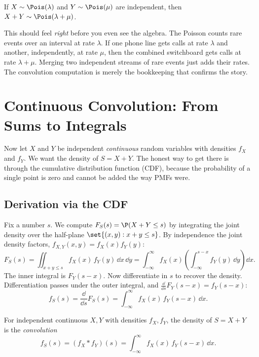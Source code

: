 \begin{theorem}
\label{ch17:thm-pois-add}
If $X\sim\Pois(\lambda)$ and $Y\sim\Pois(\mu)$ are independent, then
$X+Y \sim \Pois(\lambda+\mu)$.
\end{theorem}

\begin{intuitionbox}
This should feel \emph{right} before you even see the algebra. The Poisson
counts rare events over an interval at rate $\lambda$. If one phone line
gets calls at rate $\lambda$ and another, independently, at rate $\mu$,
then the combined switchboard gets calls at rate $\lambda+\mu$. Merging
two independent streams of rare events just adds their rates. The
convolution computation is merely the bookkeeping that confirms the story.
\end{intuitionbox}

\section{Continuous Convolution: From Sums to Integrals}
\label{ch17:cont-conv}

Now let $X$ and $Y$ be independent \emph{continuous} random variables with
densities $f_X$ and $f_Y$. We want the density of $S = X+Y$. The honest
way to get there is through the cumulative distribution function (CDF),
because the probability of a single point is zero and cannot be added the
way PMFs were.

\subsection{Derivation via the CDF}

Fix a number $s$. We compute $F_S(s) = \P(X+Y \le s)$ by integrating the
joint density over the half-plane $\set{(x,y): x+y\le s}$. By independence
the joint density factors, $f_{X,Y}(x,y)=f_X(x)f_Y(y)$:
\[
F_S(s) = \iint_{x+y\le s} f_X(x)\,f_Y(y)\,\dd x\,\dd y
       = \int_{-\infty}^{\infty} f_X(x)
         \left( \int_{-\infty}^{s-x} f_Y(y)\,\dd y \right) \dd x.
\]
The inner integral is $F_Y(s-x)$. Now differentiate in $s$ to recover the
density. Differentiation passes under the outer integral, and
$\frac{\dd}{\dd s}F_Y(s-x)=f_Y(s-x)$:
\[
f_S(s) = \frac{\dd}{\dd s}F_S(s)
       = \int_{-\infty}^{\infty} f_X(x)\,f_Y(s-x)\,\dd x.
\]

\begin{definition}
\label{ch17:def-cont-conv}
For independent continuous $X,Y$ with densities $f_X,f_Y$, the density of
$S=X+Y$ is the \emph{convolution}
\[
f_S(s) = (f_X * f_Y)(s) = \int_{-\infty}^{\infty} f_X(x)\,f_Y(s-x)\,\dd x.
\]
\end{definition}

